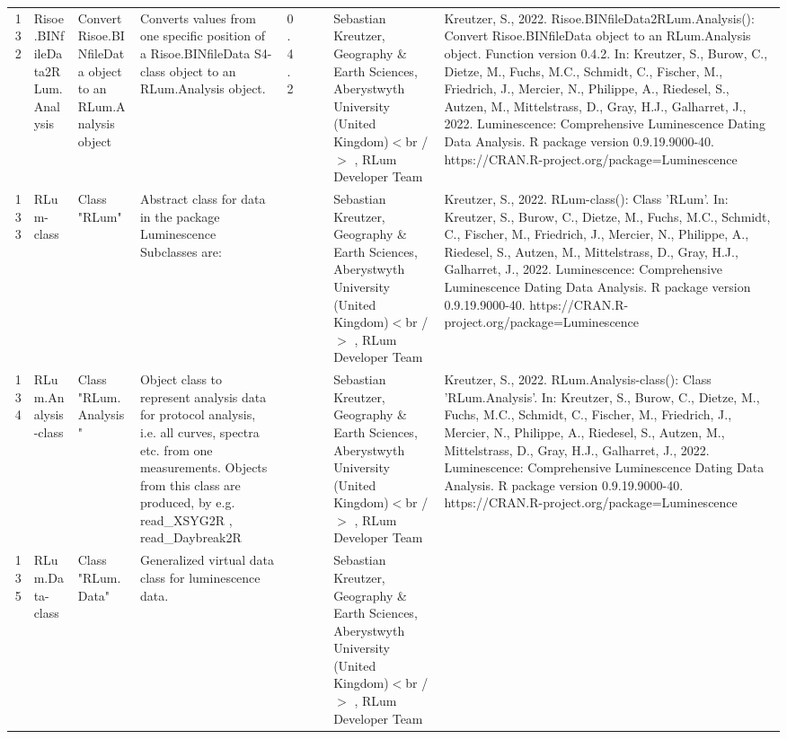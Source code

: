 \begin{table}[ht]
\begin{tabular}{rllllllll}
 \\ 
  132 & Risoe.BINfileData2RLum.Analysis & Convert Risoe.BINfileData object to an RLum.Analysis object & Converts values from one specific position of a Risoe.BINfileData S4-class object to an RLum.Analysis object. & 0.4.2
 &  &  & Sebastian Kreutzer, Geography \& Earth Sciences, Aberystwyth University (United Kingdom)$<$br /$>$ , RLum Developer Team & Kreutzer, S., 2022. Risoe.BINfileData2RLum.Analysis(): Convert Risoe.BINfileData object to an RLum.Analysis object. Function version 0.4.2. In: Kreutzer, S., Burow, C., Dietze, M., Fuchs, M.C., Schmidt, C., Fischer, M., Friedrich, J., Mercier, N., Philippe, A., Riedesel, S., Autzen, M., Mittelstrass, D., Gray, H.J., Galharret, J., 2022. Luminescence: Comprehensive Luminescence Dating Data Analysis. R package version 0.9.19.9000-40. https://CRAN.R-project.org/package=Luminescence
 \\ 
  133 & RLum-class & Class  "RLum" & Abstract class for data in the package Luminescence Subclasses are: &  &  &  & Sebastian Kreutzer, Geography \& Earth Sciences, Aberystwyth University (United Kingdom)$<$br /$>$ , RLum Developer Team & Kreutzer, S., 2022. RLum-class(): Class 'RLum'. In: Kreutzer, S., Burow, C., Dietze, M., Fuchs, M.C., Schmidt, C., Fischer, M., Friedrich, J., Mercier, N., Philippe, A., Riedesel, S., Autzen, M., Mittelstrass, D., Gray, H.J., Galharret, J., 2022. Luminescence: Comprehensive Luminescence Dating Data Analysis. R package version 0.9.19.9000-40. https://CRAN.R-project.org/package=Luminescence
 \\ 
  134 & RLum.Analysis-class & Class  "RLum.Analysis" & Object class to represent analysis data for protocol analysis, i.e. all curves, spectra etc. from one measurements. Objects from this class are produced, by e.g.  read\_XSYG2R ,  read\_Daybreak2R &  &  &  & Sebastian Kreutzer, Geography \& Earth Sciences, Aberystwyth University (United Kingdom)$<$br /$>$ , RLum Developer Team & Kreutzer, S., 2022. RLum.Analysis-class(): Class 'RLum.Analysis'. In: Kreutzer, S., Burow, C., Dietze, M., Fuchs, M.C., Schmidt, C., Fischer, M., Friedrich, J., Mercier, N., Philippe, A., Riedesel, S., Autzen, M., Mittelstrass, D., Gray, H.J., Galharret, J., 2022. Luminescence: Comprehensive Luminescence Dating Data Analysis. R package version 0.9.19.9000-40. https://CRAN.R-project.org/package=Luminescence
 \\ 
  135 & RLum.Data-class & Class  "RLum.Data" & Generalized virtual data class for luminescence data. &  &  &  & Sebastian Kreutzer, Geography \& Earth Sciences, Aberystwyth University (United Kingdom)$<$br /$>$ , RLum Developer Team &  \\ 

\end{tabular}
\end{table}
